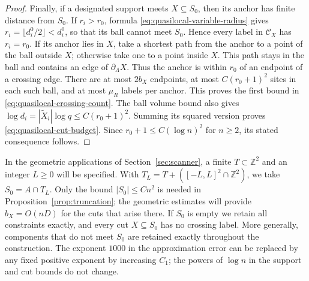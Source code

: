 \begin{proof}
Finally, if a designated support meets $X\subseteq S_0$, then its anchor
has finite distance from $S_0$.  If $r_i>r_0$, formula
\eqref{eq:quasilocal-variable-radius} gives
$r_i=\lfloor d_i^0/2\rfloor<d_i^0$, so that its ball cannot meet
$S_0$.  Hence every label in $\mathcal C_X$ has $r_i=r_0$.
If its anchor lies in $X$, take a shortest path from the anchor to a
point of the ball outside $X$; otherwise take one to a point inside $X$.
This path stays in the ball and contains an edge of $\partial_\Lambda X$.
Thus the anchor is within $r_0$ of an endpoint of a crossing edge.
There are at most $2b_X$ endpoints, at most $C(r_0+1)^2$ sites in each
such ball, and at most $\mu_R$ labels per anchor.  This proves the first
bound in \eqref{eq:quasilocal-crossing-count}.  The ball volume bound
also gives $\log d_i=|\widetilde X_i|\log q\le C(r_0+1)^2$.
Summing its squared version proves \eqref{eq:quasilocal-cut-budget}.
Since $r_0+1\le C(\log n)^2$ for $n\ge2$, its stated consequence
follows.
\end{proof}

In the geometric applications of Section~\ref{sec:scanner}, a finite
$T\subset\mathbb Z^2$ and an integer $L\ge0$ will be specified.  With
$T_L=T+([-L,L]^2\cap\mathbb Z^2)$, we take $S_0=A\cap T_L$.
Only the bound $|S_0|\le Cn^2$ is needed in
Proposition~\ref{prop:truncation}; the geometric estimates will provide
$b_X=O(nD)$ for the cuts that arise there.
If $S_0$ is empty we retain all constraints exactly, and every cut
$X\subseteq S_0$ has no crossing label.  More generally, components that
do not meet $S_0$ are retained exactly throughout the construction.
The exponent $1000$ in the approximation error can be replaced by any
fixed positive exponent by increasing $C_1$; the powers of $\log n$ in
the support and cut bounds do not change.
